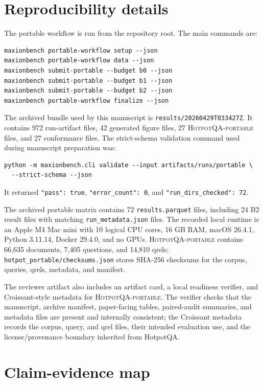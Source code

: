 \section{Reproducibility details}

The portable workflow is run from the repository root. The main commands are:
\begin{verbatim}
maxionbench portable-workflow setup --json
maxionbench portable-workflow data --json
maxionbench submit-portable --budget b0 --json
maxionbench submit-portable --budget b1 --json
maxionbench submit-portable --budget b2 --json
maxionbench portable-workflow finalize --json
\end{verbatim}
The archived bundle used by this manuscript is \texttt{results/20260429T033427Z}. It contains 972 run-artifact files, 42 generated figure files, 27 \textsc{HotpotQA-portable} files, and 27 conformance files. The strict-schema validation command used during manuscript preparation was:
\begin{verbatim}
python -m maxionbench.cli validate --input artifacts/runs/portable \
  --strict-schema --json
\end{verbatim}
It returned \texttt{"pass": true}, \texttt{"error\_count": 0}, and \texttt{"run\_dirs\_checked": 72}.

The archived portable matrix contains 72 \texttt{results.parquet} files, including 24 B2 result files with matching \texttt{run\_metadata.json} files. The recorded local runtime is an Apple M4 Mac mini with 10 logical CPU cores, 16 GB RAM, macOS 26.4.1, Python 3.11.14, Docker 29.4.0, and no GPUs. \textsc{HotpotQA-portable} contains 66{,}635 documents, 7{,}405 questions, and 14{,}810 qrels; \texttt{hotpot\_portable/checksums.json} stores SHA-256 checksums for the corpus, queries, qrels, metadata, and manifest.

The reviewer artifact also includes an artifact card, a local readiness verifier, and Croissant-style metadata for \textsc{HotpotQA-portable}. The verifier checks that the manuscript, archive manifest, paper-facing tables, paired-audit summaries, and metadata files are present and internally consistent; the Croissant metadata records the corpus, query, and qrel files, their intended evaluation use, and the license/provenance boundary inherited from HotpotQA.

\section{Claim-evidence map}

